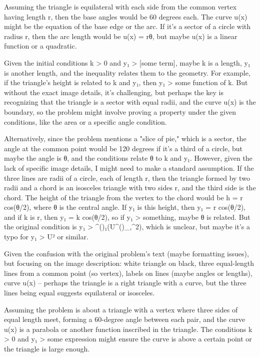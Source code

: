 Assuming the triangle is equilateral with each side from the common vertex having length r, then the base angles would be 60 degrees each. The curve u(x) might be the equation of the base edge or the arc. If it's a sector of a circle with radius r, then the arc length would be u(x) = rθ, but maybe u(x) is a linear function or a quadratic. 

Given the initial conditions k > 0 and y₁ > [some term], maybe k is a length, y₁ is another length, and the inequality relates them to the geometry. For example, if the triangle's height is related to k and y₁, then y₁ > some function of k. But without the exact image details, it's challenging, but perhaps the key is recognizing that the triangle is a sector with equal radii, and the curve u(x) is the boundary, so the problem might involve proving a property under the given conditions, like the area or a specific angle condition. 

Alternatively, since the problem mentions a "slice of pie," which is a sector, the angle at the common point would be 120 degrees if it's a third of a circle, but maybe the angle is θ, and the conditions relate θ to k and y₁. However, given the lack of specific image details, I might need to make a standard assumption. If the three lines are radii of a circle, each of length r, then the triangle formed by two radii and a chord is an isosceles triangle with two sides r, and the third side is the chord. The height of the triangle from the vertex to the chord would be h = r cos(θ/2), where θ is the central angle. If y₁ is this height, then y₁ = r cos(θ/2), and if k is r, then y₁ = k cos(θ/2), so if y₁ > something, maybe θ is related. But the original condition is y₁ > ^()₁(U^()_,^2), which is unclear, but maybe it's a typo for y₁ > U² or similar. 

Given the confusion with the original problem's text (maybe formatting issues), but focusing on the image description: white triangle on black, three equal-length lines from a common point (so vertex), labels on lines (maybe angles or lengths), curve u(x) – perhaps the triangle is a right triangle with a curve, but the three lines being equal suggests equilateral or isosceles. 

Assuming the problem is about a triangle with a vertex where three sides of equal length meet, forming a 60-degree angle between each pair, and the curve u(x) is a parabola or another function inscribed in the triangle. The conditions k > 0 and y₁ > some expression might ensure the curve is above a certain point or the triangle is large enough. 

